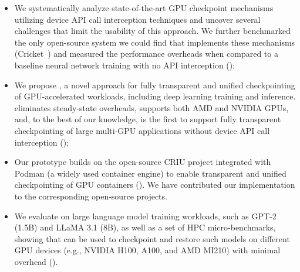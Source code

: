 \begin{itemize}
    \item We systematically analyze state-of-the-art GPU checkpoint mechanisms utilizing device API call interception techniques and uncover several challenges that limit the usability of this approach. We further benchmarked the only open-source system we could find that implements these mechanisms (Cricket~\cite{eiling2022cricket}) and measured the performance overheads when compared to a baseline neural network training with no API interception (\textsection{\ref{sec:background}});
    
    \item We propose \sys, a novel approach for fully transparent and unified checkpointing of GPU-accelerated workloads, including deep learning training and inference. \sys eliminates steady-state overheads, supports both AMD and NVIDIA GPUs, and, to the best of our knowledge, is the first to support fully transparent checkpointing of large multi-GPU applications without device API call interception (\textsection{\ref{sec:design}});

    \item Our prototype builds on the open-source CRIU project integrated with Podman (a widely used container engine) to enable transparent and unified checkpointing of GPU containers (\textsection{\ref{sec:implementation}}). We have contributed our implementation to the corresponding open-source projects.

    \item We evaluate {\sys} on large language model training workloads, such as GPT-2 (1.5B) and LLaMA 3.1 (8B), as well as a set of HPC micro-benchmarks, showing that {\sys} can be used to checkpoint and restore such models on different GPU devices (e.g., NVIDIA H100, A100, and AMD MI210) with minimal overhead (\textsection{\ref{sec:evaluation}}).
\end{itemize}
